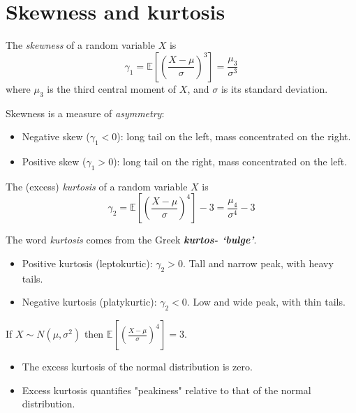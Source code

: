 \documentclass[lecture]{csm}
\newcommand{\expe}{\mathbb{E}}
\def\it{\item}
\def\bit{\begin{itemize}}
\def\eit{\end{itemize}}
\begin{document}
\section{Skewness and kurtosis}

\begin{definition}
The \emph{skewness} of a random variable $X$ is 
\[
\gamma_1 = \expe\left[\left(\frac{X-\mu}{\sigma}\right)^3\right] = \frac{\mu_{3}}{\sigma^3}
\]
where $\mu_3$ is the third central moment of $X$, and $\sigma$ is its standard deviation. 
\end{definition}

Skewness is a measure of \emph{asymmetry}:
\bit
\it Negative skew ($\gamma_1 < 0$): long tail on the left, mass concentrated on the right.
\it Positive skew ($\gamma_1 > 0$): long tail on the right, mass concentrated on the left.
\eit

\newpage

%
\begin{definition}
The (excess) \emph{kurtosis} of a random variable $X$ is 
\[
\gamma_2 = \expe\left[\left(\frac{X-\mu}{\sigma}\right)^4\right]-3 = \frac{\mu_{4}}{\sigma^4}-3
\]
\end{definition}

The word \textit{kurtosis} comes from the Greek \textbf{\textit{kurtos- `bulge'}}.
\bit
\it Positive kurtosis (leptokurtic): $\gamma_2 > 0$. Tall and narrow peak, with heavy tails.
\it Negative kurtosis (platykurtic): $\gamma_2 < 0$. Low and wide peak, with thin tails.
\eit

\begin{remark}
If $X\sim N(\mu,\sigma^2)$ then
$\displaystyle
\expe\left[\left(\frac{X-\mu}{\sigma}\right)^4\right] = 3.
$
\bit
\it The excess kurtosis of the normal distribution is zero.
\it Excess kurtosis quantifies "peakiness" relative to that of the normal distribution.
\eit
\end{remark}
\end{document}
